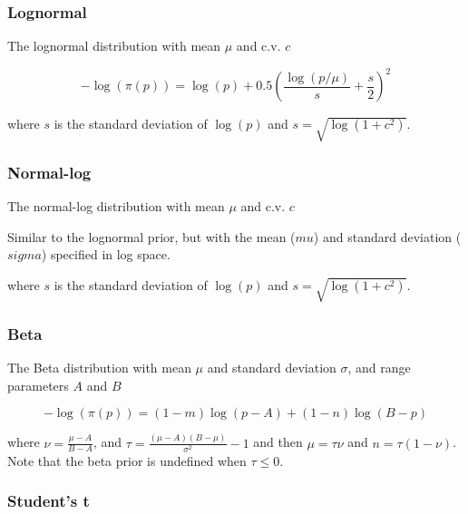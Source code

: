 \subsubsection{Lognormal}\label{sec:Prior-Lognormal}

The lognormal distribution with mean $\mu$ and c.v. $c$

\begin{equation}
 - \log \left(\pi \left(p \right) \right) = \log \left( p \right) + 0.5 \left( \frac{\log \left( p / \mu \right)}{s} + \frac{s}{2} \right)^2
\end{equation}

where $s$ is the standard deviation of $\log(p)$ and $s= \sqrt{\log \left(1+c^2 \right)}$.

\subsubsection{Normal-log}\label{sec:Prior-NormalLog}

The normal-log distribution  with mean $\mu$ and c.v. $c$

Similar to the lognormal prior, but with the mean ($mu$) and standard deviation ($sigma$) specified in log space.

where $s$ is the standard deviation of $\log(p)$ and $s= \sqrt{\log \left(1+c^2 \right)}$.

\subsubsection{Beta}\label{sec:Prior-Beta}

The Beta distribution with mean $\mu$ and standard deviation $\sigma$, and range parameters $A$ and $B$

\begin{equation}
 - \log \left(\pi \left( p \right) \right) = \left( 1 - m \right) \log \left( p - A \right) + \left( 1 - n \right)\log \left( B - p \right)
\end{equation}

where $\nu  = \frac{\mu  - A}{B - A}$, and $\tau = \frac{\left(\mu -A \right)\left(B - \mu \right)}{\sigma ^2} - 1$ and then $\mu=\tau \nu$ and $n=\tau(1-\nu)$. Note that the beta prior is undefined when $\tau \leq 0$.

\subsubsection{Student's t}\label{sec:Prior-Studentst}

